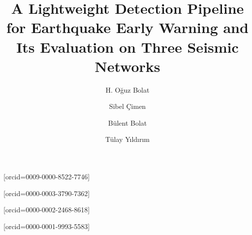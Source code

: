 \documentclass[a4paper,fleqn]{cas-sc}
\begin{document}
\let\WriteBookmarks\relax
\def\floatpagepagefraction{1}
\def\textpagefraction{.001}

\title [mode = title]{A Lightweight Detection Pipeline for Earthquake Early Warning
and Its Evaluation on Three Seismic Networks}

\author[1]{H. O\u{g}uz Bolat}[orcid=0009-0000-8522-7746]
\cormark[1]

\author[2]{Sibel \c{C}imen}[orcid=0000-0003-3790-7362]

\author[2]{B\"ulent Bolat}[orcid=0000-0002-2468-8618]

\author[2]{T\"ulay Y\i{}ld\i{}r\i{}m}[orcid=0000-0001-9993-5583]

\address[1]{Department of Geomatics Engineering, Y\i{}ld\i{}z Technical University,
Davutpa\c{s}a Campus, 34220 Esenler, \.Istanbul, T\"urkiye}
\address[2]{Department of Electronics and Communication Engineering, Y\i{}ld\i{}z
Technical University, Davutpa\c{s}a Campus, 34220 Esenler, \.Istanbul, T\"urkiye}

\end{document}
